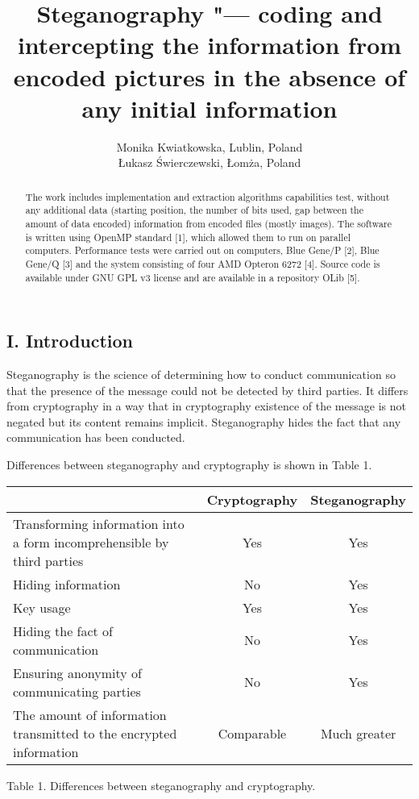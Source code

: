 \documentclass[10pt, a5paper]{article}
\begin{document}
\title{Steganography "--- coding and intercepting the information from encoded pictures in the absence of any initial information}
\author{Monika Kwiatkowska, Lublin, Poland\\ \L{}ukasz \'S{}wierczewski, \L{}om\.z{}a, Poland}
\maketitle
\begin{abstract}
The work includes implementation and extraction algorithms capabilities test, without any additional data (starting position, the number of bits used, gap between the amount of data encoded) information from encoded files (mostly images). The software is written using OpenMP standard [1], which allowed them to run on parallel computers. Performance tests were carried out on computers, Blue Gene/P [2], Blue Gene/Q [3] and the system consisting of four AMD Opteron 6272 [4]. Source code is available under GNU GPL v3 license and are available in a repository OLib [5].
\end{abstract}
\subsection*{I. Introduction}

Steganography is the science of determining how to conduct communication so that the presence of the message could not be detected by third parties. It differs from cryptography in a way that in cryptography existence of the message is not negated but its content remains implicit. Steganography hides the fact that any communication has been conducted.

Differences between steganography and cryptography is shown in Table 1.

\begin{center}
\begin{tabular}{p{13em}|c|c}
                                                                            & Cryptography & Steganography \\
\hline
Transforming information into a form in\-compre\-hensible by third parties  &     Yes      &     Yes       \\
Hiding information                                                          &     No       &     Yes       \\
Key usage                                                                   &     Yes      &     Yes       \\
Hiding the fact of commu\-ni\-ca\-tion                                      &     No       &     Yes       \\
Ensuring anonymity of commu\-ni\-ca\-ting parties                           &     No       &     Yes       \\
The amount of information transmitted to the encrypted information          &  Comparable  &  Much greater \\
\end{tabular}

Table 1. Differences between steganography and cryptography.
\end{center}
\end{document}
